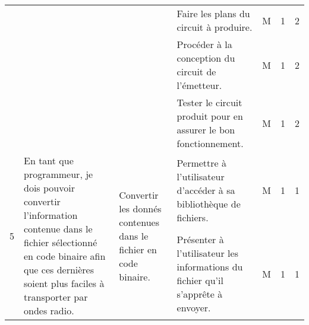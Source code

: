 \begin{table}[ht]
\begin{tabularx}{20 cm}{|c|X|X|X|c|c|c|}
        &
        &
        & Faire les plans du circuit à produire.
        & M & 1 & 2 \\
    \cline{4-7}
        
        &
        &
        & Procéder à la conception du circuit de l'émetteur.
        & M & 1 & 2 \\
    \cline{4-7}
        
        &
        &
        & Tester le circuit produit pour en assurer le bon fonctionnement.
        & M & 1 & 2 \\
    \hline
          \multirow{2}{*}{5} 
        & \multirow{2}{=}{
          En tant que programmeur, 
          je dois pouvoir convertir l'information contenue 
          dans le fichier sélectionné en code binaire afin que ces 
          dernières soient plus faciles à transporter par ondes radio.} 
        & \multirow{2}{=}{Convertir les donnés contenues dans le fichier en code binaire.} 
        & Permettre à l'utilisateur d'accéder à sa bibliothèque de fichiers. 
        & M & 1 & 1 \\
    \cline{4-7}
        
        &
        &
        & Présenter à l'utilisateur les informations du fichier qu'il s'apprête à envoyer.
        & M & 1 & 1 \\
    \hline
    \end{tabularx}
\end{table}